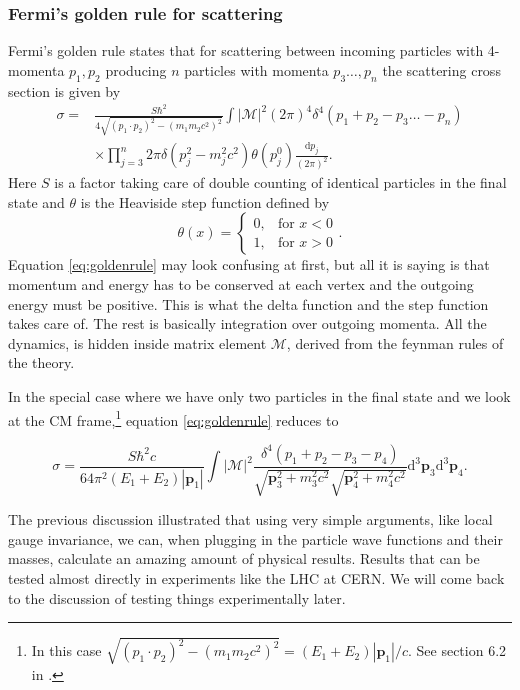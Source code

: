 \subsubsection{Fermi's golden rule for scattering}
Fermi's golden rule states that for scattering between incoming particles with 4-momenta $p_1, p_2$ producing $n$ particles with momenta $p_3 \dots , p_n$ the scattering cross section is given by \cite{griffiths1987iep}
\begin{align} \label{eq:goldenrule}
	\sigma = &\frac{S\hbar^2}{4\sqrt{(p_1 \cdot p_2)^2 - (m_1 m_2 c^2)^2}} \int |\mathcal{M}|^2 (2 \pi)^4 \delta^4(p_1+p_2-p_3 \dots -p_n) \nonumber \\
	&\times \prod_{j=3}^n 2\pi \delta(p_j^2 - m_j^2c^2)\theta(p_j^0) \frac{\textrm{d}p_j}{(2\pi)^2}.
\end{align}
Here $S$ is a factor taking care of double counting of identical particles in the final state and $\theta$ is the Heaviside step function defined by
\begin{equation}
	 \theta(x) = 
	\begin{cases} 
	  0,  & \mbox{for }x < 0 \\
	  1,  & \mbox{for }x > 0 
	\end{cases}.
\end{equation}
Equation \eqref{eq:goldenrule} may look confusing at first, but all it is saying is that momentum and energy has to be conserved at each vertex and the outgoing energy must be positive. This is what the delta function and the step function takes care of. The rest is basically integration over outgoing momenta. All the dynamics, is hidden inside matrix element $\mathcal{M}$, derived from the feynman rules of the theory.

In the special case where we have only two particles in the final state and we look at the CM frame,\footnote{In this case $\sqrt{(p_1\cdot p_2)^2 - (m_1m_2 c^2)^2} = (E_1+E_2)|\mathbf{p}_1|/c$. See section 6.2 in \cite{griffiths1987iep}.} equation \eqref{eq:goldenrule} reduces to \cite{griffiths1987iep}

\begin{equation}
	\sigma = \frac{S\hbar^2c}{64\pi^2(E_1+E_2)|\mathbf{p}_1|} \int | \mathcal{M} |^2
	\frac{\delta^4(p_1+p_2-p_3-p_4)}{\sqrt{\mathbf{p}_3^2+m_3^2c^2}\sqrt{\mathbf{p}_4^2+m_4^2c^2}} \textrm{d}^3\mathbf{p}_3\textrm{d}^3\mathbf{p}_4.
\end{equation}

The previous discussion illustrated that using very simple arguments, like local gauge invariance, we can, when plugging in the particle wave functions and their masses, calculate an amazing amount of physical results. Results that can be tested almost directly in experiments like the LHC at CERN. We will come back to the discussion of testing things experimentally later.


